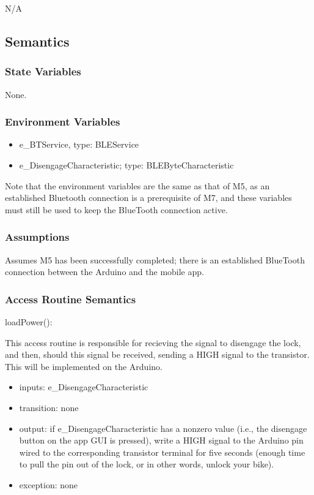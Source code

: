 \documentclass[12pt, titlepage]{article}
\begin{document}
N/A

\subsection{Semantics}

\subsubsection{State Variables}

None.

\subsubsection{Environment Variables}

\begin{itemize}
\item e\_BTService, type: BLEService
\item e\_DisengageCharacteristic; type: BLEByteCharacteristic
\end{itemize}

Note that the environment variables are the same as that of M5, as an established Bluetooth connection is a prerequisite of M7, and these variables must still be used to keep the BlueTooth connection active. 

\subsubsection{Assumptions}

Assumes M5 has been successfully completed; there is an established BlueTooth connection between the Arduino and the mobile app.

\subsubsection{Access Routine Semantics}

\noindent loadPower():

This access routine is responsible for recieving the signal to disengage the lock, and then, should this signal be received, sending a HIGH signal to the transistor. This will be implemented on the Arduino. 

\begin{itemize}
\item inputs: e\_DisengageCharacteristic
\item transition: none 
\item output: if e\_DisengageCharacteristic has a nonzero value (i.e., the disengage button on the app GUI is pressed), write a HIGH signal to the Arduino pin wired to the corresponding transistor terminal for five seconds (enough time to pull the pin out of the lock, or in other words, unlock your bike). 
\item exception: none 
\end{itemize}
\end{document}
